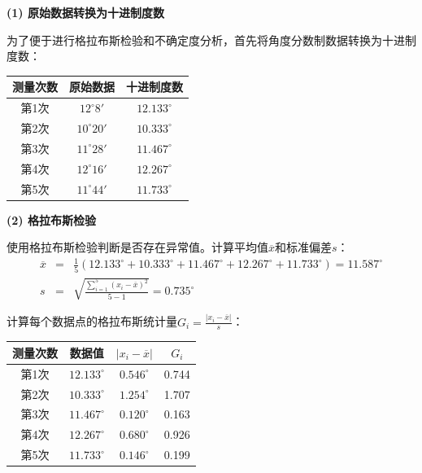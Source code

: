 ﻿\documentclass[12pt,a4paper]{article}
\begin{document}
\textbf{(1) 原始数据转换为十进制度数}

为了便于进行格拉布斯检验和不确定度分析，首先将角度分数制数据转换为十进制度数：

\begin{center}
    \begin{tabular}{ccc}
        \toprule
        测量次数 & 原始数据 & 十进制度数 \\
        \midrule
        第1次 & $12^\circ8'$ & $12.133^\circ$ \\
        第2次 & $10^\circ20'$ & $10.333^\circ$ \\
        第3次 & $11^\circ28'$ & $11.467^\circ$ \\
        第4次 & $12^\circ16'$ & $12.267^\circ$ \\
        第5次 & $11^\circ44'$ & $11.733^\circ$ \\
        \bottomrule
    \end{tabular}
\end{center}

\textbf{(2) 格拉布斯检验}

使用格拉布斯检验判断是否存在异常值。计算平均值$\overline{x}$和标准偏差$s$：
\begin{eqnarray}
\overline{x} &=& \frac{1}{5}(12.133^\circ + 10.333^\circ + 11.467^\circ + 12.267^\circ + 11.733^\circ) = 11.587^\circ \\
s &=& \sqrt{\frac{\sum_{i=1}^{5}(x_i - \overline{x})^2}{5-1}} = 0.735^\circ
\end{eqnarray}

计算每个数据点的格拉布斯统计量$G_i = \frac{|x_i - \overline{x}|}{s}$：

\begin{center}
    \begin{tabular}{cccc}
        \toprule
        测量次数 & 数据值 & $|x_i - \overline{x}|$ & $G_i$ \\
        \midrule
        第1次 & $12.133^\circ$ & $0.546^\circ$ & 0.744 \\
        第2次 & $10.333^\circ$ & $1.254^\circ$ & 1.707 \\
        第3次 & $11.467^\circ$ & $0.120^\circ$ & 0.163 \\
        第4次 & $12.267^\circ$ & $0.680^\circ$ & 0.926 \\
        第5次 & $11.733^\circ$ & $0.146^\circ$ & 0.199 \\
        \bottomrule
    \end{tabular}
\end{center}
\end{document}
